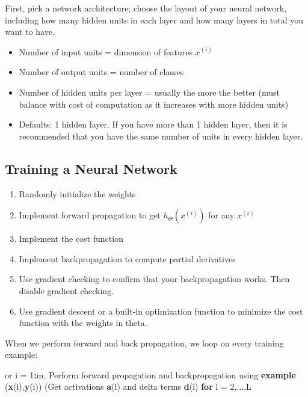 \documentclass[
]{book}
\newenvironment{Shaded}{\begin{snugshade}}{\end{snugshade}}
\newcommand{\ControlFlowTok}[1]{\textcolor[rgb]{0.13,0.29,0.53}{\textbf{#1}}}
\newcommand{\DataTypeTok}[1]{\textcolor[rgb]{0.13,0.29,0.53}{#1}}
\newcommand{\DecValTok}[1]{\textcolor[rgb]{0.00,0.00,0.81}{#1}}
\newcommand{\KeywordTok}[1]{\textcolor[rgb]{0.13,0.29,0.53}{\textbf{#1}}}
\newcommand{\NormalTok}[1]{#1}
\newcommand{\OperatorTok}[1]{\textcolor[rgb]{0.81,0.36,0.00}{\textbf{#1}}}
\newcommand{\StringTok}[1]{\textcolor[rgb]{0.31,0.60,0.02}{#1}}
\providecommand{\tightlist}{%
  \setlength{\itemsep}{0pt}\setlength{\parskip}{0pt}}
\begin{document}
First, pick a network architecture; choose the layout of your neural network, including how many hidden units in each layer and how many layers in total you want to have.

\begin{itemize}
\tightlist
\item
  Number of input units = dimension of features \(x^{(i)}\)
\item
  Number of output units = number of classes
\item
  Number of hidden units per layer = usually the more the better (must balance with cost of computation as it increases with more hidden units)
\item
  Defaults: 1 hidden layer. If you have more than 1 hidden layer, then it is recommended that you have the same number of units in every hidden layer.
\end{itemize}

\hypertarget{training-a-neural-network}{%
\subsection{Training a Neural Network}\label{training-a-neural-network}}

\begin{enumerate}
\def\labelenumi{\arabic{enumi}.}
\tightlist
\item
  Randomly initialize the weights
\item
  Implement forward propagation to get \(h_\Theta(x^{(i)})\) for any \(x^{(i)}\)
\item
  Implement the cost function
\item
  Implement backpropagation to compute partial derivatives
\item
  Use gradient checking to confirm that your backpropagation works. Then disable gradient checking.
\item
  Use gradient descent or a built-in optimization function to minimize the cost function with the weights in theta.
\end{enumerate}

When we perform forward and back propagation, we loop on every training example:

\begin{Shaded}
\begin{Highlighting}[]
\NormalTok{or i =}\StringTok{ }\DecValTok{1}\OperatorTok{:}\NormalTok{m,}
\NormalTok{   Perform forward propagation and backpropagation using }\KeywordTok{example}\NormalTok{ (}\KeywordTok{x}\NormalTok{(i),}\KeywordTok{y}\NormalTok{(i))}
\NormalTok{   (Get activations }\KeywordTok{a}\NormalTok{(l) and delta terms }\KeywordTok{d}\NormalTok{(l) }\ControlFlowTok{for} \DataTypeTok{l =} \DecValTok{2}\NormalTok{,...,L}
\end{Highlighting}
\end{Shaded}
\end{document}
